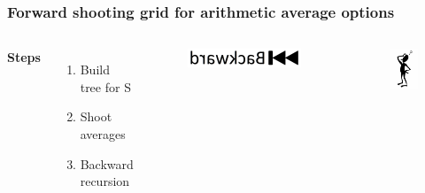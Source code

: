 \documentclass{beamer}
\begin{document}
\begin{frame}
\frametitle{Forward shooting grid for arithmetic average options}
\begin{columns}[c] %

\textbf{Steps}
\begin{enumerate}
\item Build tree for S
\item Shoot averages
\item Backward recursion
\end{enumerate}

\begin{figure}
	\includegraphics[scale=0.1]{backward}
\end{figure}
\begin{figure}
	\includegraphics[scale=0.4]{question_mark}
\end{figure}

\end{columns}
\end{frame}

\end{document}
